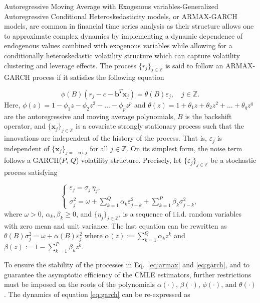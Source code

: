 \documentclass{rQUF2e}
\newcommand{\Z}{\mathbb{Z}}
\theoremstyle{plain}
\theoremstyle{definition}
\theoremstyle{remark}
\begin{document}
Autoregressive Moving Average with Exogenous variables-Generalized Autoregressive Conditional Heteroskedasticity models, or ARMAX-GARCH models, are common in financial time series analysis as their structure allows one to approximate complex dynamics by implementing a dynamic dependence of endogenous values combined with exogenous variables while allowing for a conditionally heteroskedastic volatility structure which can capture volatility clustering and leverage effects. The process $\{r_j\}_{j \in \Z}$ is said to follow an ARMAX-GARCH process if it satisfies the following equation

\begin{equation}
    \phi(B) \left( r_j - c - \mathbf{b}^T \mathbf{x}_j \right) = \theta(B) \varepsilon_j, \quad j \in \Z.
    \label{eq:armax}
\end{equation}
Here, $\phi(z) = 1 - \phi_1 z - \phi_2 z^2 - \dots - \phi_p z^p$ and $\theta(z) = 1 + \theta_1 z + \theta_2 z^2 + \dots + \theta_q z^q$ are the autoregressive and moving average polynomials, $B$ is the backshift operator, and $\{ \mathbf{x}_j \}_{j \in \Z}$ is a covariate strongly stationary process such that the innovations are independent of the history of the process. That is, $\varepsilon_j$ is independent of $\{ \mathbf{x}_j \}_{j = - \infty : j}$ for all $j \in \Z$. On its simplest form, the noise term follows a GARCH($P$, $Q$) volatility structure. Precisely, let $\{ \varepsilon_j \}_{j \in \Z}$ be a stochastic process satisfying

\begin{equation}
    \begin{cases}
        \varepsilon_j = \sigma_j \,\eta_j, \\[6pt]
        \sigma_j^2 = \omega + \sum^{Q}_{k = 1} \alpha_k \varepsilon^2_{j - k} + \sum^P_{k = 1} \beta_k \sigma_{j - k}^2,
    \end{cases}
    \label{eq:garch}
\end{equation}
where $\omega > 0$, $\alpha_k, \beta_k \geq 0$, and $\{ \eta_j\}_{j \in \Z}$, is a sequence of i.i.d. random variables with zero mean and unit variance. The last equation can be rewritten as $\theta(B) \sigma^2_j = \omega + \alpha(B) \varepsilon^2_j$ where $\alpha(z) := \sum^Q_{k = 1} \alpha_k z^k$ and $\beta(z) := 1 - \sum^P_{k = 1} \beta_k z^k$.

To ensure the stability of the processes in Eq.~\eqref{eq:armax} and \eqref{eq:garch}, and to guarantee the asymptotic efficiency of the CMLE estimators, further restrictions must be imposed on the roots of the polynomials $\alpha(\cdot)$, $\beta(\cdot)$, $\phi(\cdot)$, and $\theta(\cdot)$ \citep[for a detailed technical discussion, see][]{mejia2026asymptotic}. The dynamics of equation \eqref{eq:garch} can be re-expressed as
\end{document}
